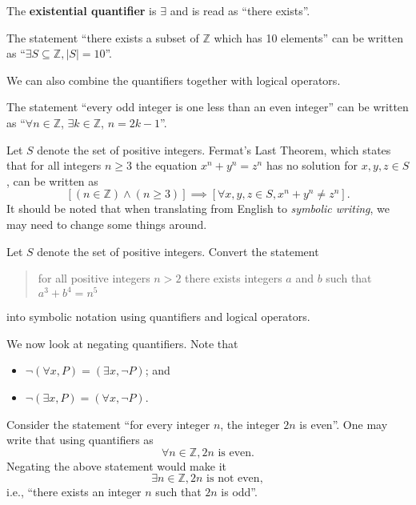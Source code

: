 \begin{definition}
    The \textbf{existential quantifier} is $\exists$ and is  read as ``there exists''.
\end{definition}
\begin{example}
    The statement ``there exists a subset of $\mathbb{Z}$ which has 10 elements'' can be written as ``$\exists S \subseteq \mathbb{Z}, |S| = 10$''.
\end{example}

We can also combine the quantifiers together with logical operators.
\begin{example}
    The statement ``every odd integer is one less than an even integer'' can be written as ``$\forall n \in \mathbb{Z}$, $\exists k \in \mathbb{Z}$, $n = 2k - 1$''.
\end{example}
\begin{example}
    Let $S$ denote the set of positive integers. Fermat's Last Theorem, which states that for all integers $n\geq 3$ the equation $x^n + y^n = z^n$ has no solution for $x, y, z \in S$, can be written as
    \[
        \left[(n \in \mathbb{Z}) \land (n \geq 3)\right] \implies \left[\forall x, y, z \in S, x^n + y^n \neq z^n\right].
    \]
    It should be noted that when translating from English to \textit{symbolic writing}, we may need to change some things around.
\end{example}

\newpage

\begin{exercise}
    Let $S$ denote the set of positive integers. Convert the statement
    \begin{quote}
        for all positive integers $n > 2$ there exists integers $a$ and $b$ such that $a^3 + b^4 = n^5$
    \end{quote}
    into symbolic notation using quantifiers and logical operators.
\end{exercise}

We now look at negating quantifiers. Note that
\begin{itemize}
    \item $\lnot(\forall x, P) = (\exists x, \lnot P)$; and
    \item $\lnot(\exists x, P) = (\forall x, \lnot P)$.
\end{itemize}
\begin{example}
    Consider the statement ``for every integer $n$, the integer $2n$ is even''. One may write that using quantifiers as
    \[
        \forall n \in\mathbb{Z}, 2n \text{ is even}.
    \]
    Negating the above statement would make it
    \[
        \exists n \in \mathbb{Z}, 2n \text{ is not even},
    \]
    i.e., ``there exists an integer $n$ such that $2n$ is odd''.
\end{example}

